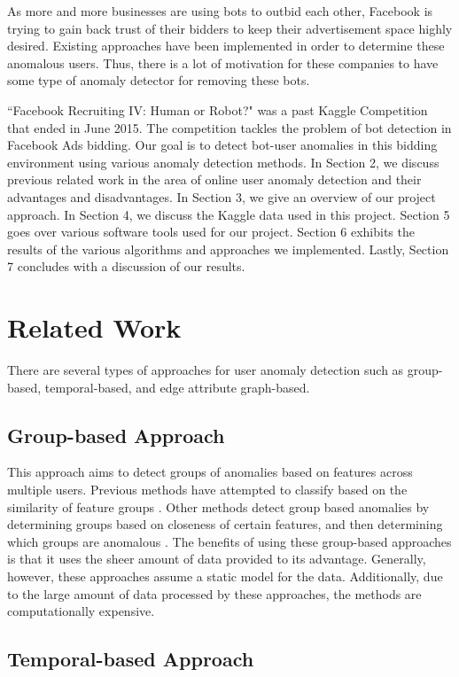 \documentclass{article} %
\begin{document}
As more and more businesses are using bots to outbid each other, Facebook is trying to gain back trust of their bidders to keep their advertisement space highly desired. Existing approaches have been implemented in order to determine these anomalous users.
Thus, there is a lot of motivation for these companies to have some type of anomaly detector for removing these bots. 

``Facebook Recruiting IV: Human or Robot?" was a past Kaggle Competition that ended in June 2015.
The competition tackles the problem of bot detection in Facebook Ads bidding.
Our goal is to detect bot-user anomalies in this bidding environment using various anomaly detection methods.
In Section 2, we discuss previous related work in the area of online user anomaly detection and their advantages and disadvantages. In Section 3, we give an overview of our project approach. In Section 4, we discuss the Kaggle data used in this project. Section 5 goes over various software tools used for our project. Section 6 exhibits the results of the various algorithms and approaches we implemented. Lastly, Section 7 concludes with a discussion of our results.

\section{Related Work}

There are several types of approaches for user anomaly detection such as group-based, temporal-based, and edge attribute graph-based.

\subsection{Group-based Approach}

This approach aims to detect groups of anomalies based on features across multiple users.
Previous methods have attempted to classify based on the similarity of feature groups \cite{ndsync}.
Other methods detect group based anomalies by determining groups based on closeness of certain features, and then determining which groups are anomalous \cite{glad}.
The benefits of using these group-based approaches is that it uses the sheer amount of data provided to its advantage.
Generally, however, these approaches assume a static model for the data.
Additionally, due to the large amount of data processed by these approaches, the methods are computationally expensive.

\subsection{Temporal-based Approach}
\end{document}
